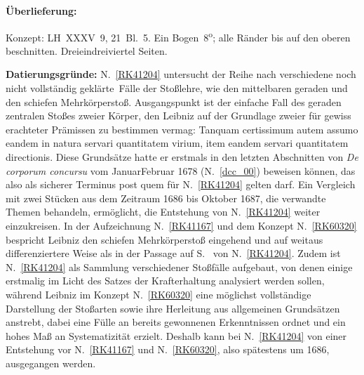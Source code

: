 %  
%
%
%
%
%
%
\frenchspacing
%
\begin{ledgroupsized}[r]{120mm}
\footnotesize
\pstart
\noindent\textbf{Überlieferung:}
\pend
\end{ledgroupsized}
%
%
\begin{ledgroupsized}[r]{114mm}
\footnotesize
\pstart \parindent -6mm
%
Konzept:
LH~XXXV~9, 21~Bl.~5.
Ein Bogen~8\textsuperscript{o};
alle Ränder bis auf den oberen beschnitten.
Dreieindreiviertel Seiten.
\pend
\end{ledgroupsized}
%
%
\vspace{5mm}
\begin{ledgroup}
\footnotesize
\pstart
\noindent%
\textbf{Datierungsgründe:}
N.~\ref{RK41204} untersucht der Reihe nach verschiedene \glqq noch nicht vollständig geklärte\grqq\ Fälle der Stoßlehre, wie den mittelbaren geraden und den schiefen Mehrkörperstoß.
%
Ausgangspunkt ist der einfache Fall des geraden zentralen Stoßes zweier Körper, den Leibniz
%
auf der Grundlage zweier für gewiss erachteter Prämissen zu bestimmen vermag:
%
\glqq Tanquam certissimum autem assumo eandem in natura servari quantitatem virium, item eandem servari quantitatem directionis\grqq.
%
Diese Grundsätze hatte er erstmals in den letzten Abschnitten von \textit{De corporum concursu} 
%
vom Januar\textendash Februar 1678 (N.~\ref{dcc_00}) beweisen können,
%
das also als sicherer Terminus post quem für N.~\ref{RK41204} gelten darf.
%
\pend
%
\pstart
%
Ein Vergleich mit zwei Stücken aus dem Zeitraum 1686 bis Oktober 1687, die verwandte Themen behandeln,
%
ermöglicht, die Entstehung von N.~\ref{RK41204} weiter einzukreisen.
%
In der Aufzeichnung N.~\ref{RK41167} und dem Konzept N.~\ref{RK60320}
%
bespricht Leibniz den schiefen Mehrkörperstoß eingehend und auf weitaus differenziertere Weise als
%
in der Passage auf S.~ von N.~\ref{RK41204}.
%
Zudem ist N.~\ref{RK41204} als Sammlung verschiedener Stoßfälle aufgebaut, von denen einige erstmalig im Licht des Satzes der Krafterhaltung analysiert werden sollen,
%
während Leibniz im Konzept N.~\ref{RK60320} eine möglichst vollständige Darstellung der Stoßarten 
%
sowie ihre Herleitung aus allgemeinen Grundsätzen anstrebt, dabei eine Fülle an bereits gewonnenen Erkenntnissen ordnet
%
und ein hohes Maß an Systematizität erzielt.
%
Deshalb kann bei N.~\ref{RK41204} von einer Entstehung vor N.~\ref{RK41167} und N.~\ref{RK60320}, also spätestens um 1686, ausgegangen werden.


\end{ledgroup}
